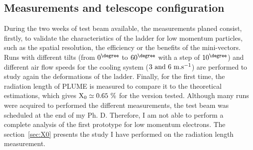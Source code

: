 

    \subsection{Measurements and telescope configuration}

    During the two weeks of test beam available, the measurements planed consist, firstly, to validate the characteristics of the ladder for low momentum particles, such as the spatial resolution, the efficiency or the benefits of the mini-vectors.
    Runs with different tilts (from $0^{\degree}$ to $60^{\degree}$ with a step of $10^{\degree}$) and different air flow speeds for the cooling system ($3~\rm{and}~6~\rm{m.s}^{-1}$) are performed to study again the deformations of the ladder.
    Finally, for the first time, the radiation length of \gls{PLUME} is measured to compare it to the theoretical estimations, which gives $\rm{X_{0}} \simeq 0.65~\%$ for the version tested.
    Although many runs were acquired to performed the different measurements, the test beam was scheduled at the end of my Ph. D.
    Therefore, I am not able to perform a complete analysis of the first prototype for low momentum electrons.
    The section~\ref{sec:X0} presents the study I have performed on the radiation length measurement.

